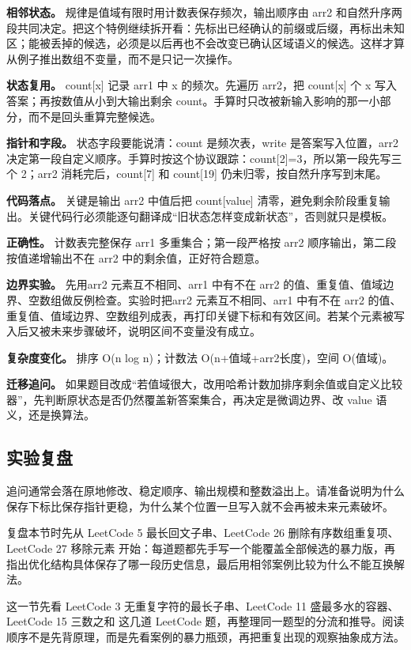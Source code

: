 \textbf{相邻状态。} 规律是值域有限时用计数表保存频次，输出顺序由 arr2 和自然升序两段共同决定。把这个特例继续拆开看：先标出已经确认的前缀或后缀，再标出未知区；能被丢掉的候选，必须是以后再也不会改变已确认区域语义的候选。这样才算从例子推出数组不变量，而不是只记一次操作。

\textbf{状态复用。} count[x] 记录 arr1 中 x 的频次。先遍历 arr2，把 count[x] 个 x 写入答案；再按数值从小到大输出剩余 count。手算时只改被新输入影响的那一小部分，而不是回头重算完整候选。

\textbf{指针和字段。} 状态字段要能说清：count 是频次表，write 是答案写入位置，arr2 决定第一段自定义顺序。手算时按这个协议跟踪：count[2]=3，所以第一段先写三个 2；arr2 消耗完后，count[7] 和 count[19] 仍未归零，按自然升序写到末尾。

\textbf{代码落点。} 关键是输出 arr2 中值后把 count[value] 清零，避免剩余阶段重复输出。关键代码行必须能逐句翻译成“旧状态怎样变成新状态”，否则就只是模板。

\textbf{正确性。} 计数表完整保存 arr1 多重集合；第一段严格按 arr2 顺序输出，第二段按值递增输出不在 arr2 中的剩余值，正好符合题意。

\textbf{边界实验。} 先用arr2 元素互不相同、arr1 中有不在 arr2 的值、重复值、值域边界、空数组做反例检查。实验时把arr2 元素互不相同、arr1 中有不在 arr2 的值、重复值、值域边界、空数组列成表，再打印关键下标和有效区间。若某个元素被写入后又被未来步骤破坏，说明区间不变量没有成立。

\textbf{复杂度变化。} 排序 O(n log n)；计数法 O(n+值域+arr2长度)，空间 O(值域)。

\textbf{迁移追问。} 如果题目改成“若值域很大，改用哈希计数加排序剩余值或自定义比较器”，先判断原状态是否仍然覆盖新答案集合，再决定是微调边界、改 value 语义，还是换算法。

\subsection{实验复盘}

追问通常会落在原地修改、稳定顺序、输出规模和整数溢出上。请准备说明为什么保存下标比保存指针更稳，为什么某个位置一旦写入就不会再被未来元素破坏。

复盘本节时先从 LeetCode 5 最长回文子串、LeetCode 26 删除有序数组重复项、LeetCode 27 移除元素 开始：每道题都先手写一个能覆盖全部候选的暴力版，再指出优化结构具体保存了哪一段历史信息，最后用相邻案例比较为什么不能互换解法。

这一节先看 LeetCode 3 无重复字符的最长子串、LeetCode 11 盛最多水的容器、LeetCode 15 三数之和 这几道 LeetCode 题，再整理同一题型的分流和推导。阅读顺序不是先背原理，而是先看案例的暴力瓶颈，再把重复出现的观察抽象成方法。

